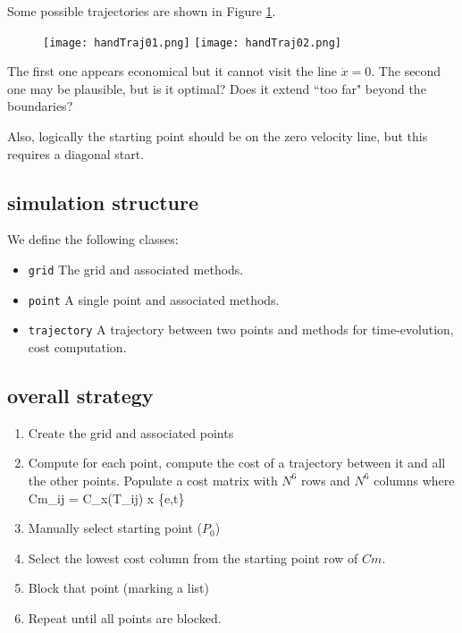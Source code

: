 \documentclass[letterpaper]{article}
\begin{document}
Some possible trajectories are shown in Figure \ref{handsolutions1D}.


\begin{figure}\centering
  \texttt{[image: handTraj01.png]}
  \texttt{[image: handTraj02.png]}
  \caption{}\label{handsolutions1D}
\end{figure}

The first one appears economical but it cannot visit the line $\dot{x} = 0$.  The second one may be plausible,
but is it optimal?   Does it extend ``too far" beyond the boundaries?

Also, logically the starting point should be on the zero velocity line, but this requires a diagonal start.

\subsection{simulation structure}
We define the following classes:
\begin{itemize}
  \item {\tt grid}   The grid and associated methods.
  \item {\tt point}  A single point and associated methods.
  \item {\tt trajectory} A trajectory between two points and methods for time-evolution, cost computation.
\end{itemize}

\subsection{overall strategy}

\begin{enumerate}
  \item Create the grid and associated points
  \item Compute for each point, compute the cost of a trajectory between it and all the other points.  Populate
  a cost matrix with $N^6$ rows and $N^6$ columns where
  \beq
    Cm_{ij} = C_x(T_{ij})  \qquad    x \in \{e,t\}
  \eeq
  \item Manually select starting point ($P_0$)
  \item Select the lowest cost column from the starting point row of $Cm$.
  \item Block that point (marking a list)
  \item Repeat until all points are blocked.
\end{enumerate}
\end{document}
